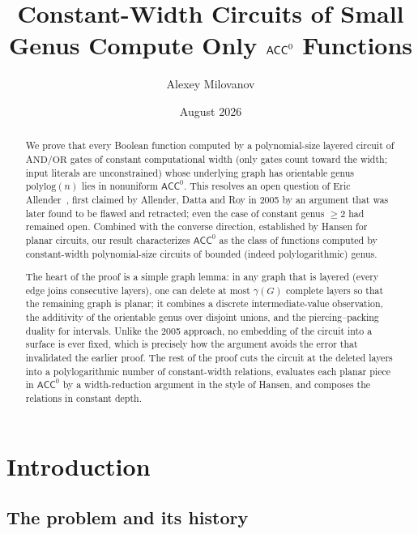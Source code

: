 \documentclass[11pt]{article}
\title{Constant-Width Circuits of Small Genus Compute Only $\ACC$ Functions}
\author{Alexey Milovanov}
\date{August 2026}
\theoremstyle{definition}
\theoremstyle{remark}
\newcommand{\ACC}{\mathsf{ACC}^0}
\newcommand{\genus}{\gamma}
\begin{document}
\maketitle

\begin{abstract}
We prove that every Boolean function computed by a polynomial-size layered circuit
of $\mathrm{AND}/\mathrm{OR}$ gates of constant computational width (only gates
count toward the width; input literals are unconstrained) whose underlying graph
has orientable genus $\mathrm{polylog}(n)$ lies in nonuniform $\ACC$. This resolves an
open question of Eric Allender~\cite{Allender23}, first claimed by Allender,
Datta and Roy in 2005 by an argument that was later found to be flawed and retracted; even the case of constant
genus $\ge 2$ had remained open. Combined with the converse direction, established by Hansen
for planar circuits, our result characterizes $\ACC$ as the class of functions
computed by constant-width polynomial-size circuits of bounded (indeed
polylogarithmic) genus.

The heart of the proof is a simple graph lemma: in any graph
that is layered (every edge joins consecutive layers), one can delete at most
$\genus(G)$ complete layers so that the remaining graph is planar; it combines a
discrete intermediate-value observation, the additivity of the orientable genus over
disjoint unions, and the piercing--packing duality for intervals. Unlike the 2005
approach, no embedding of the circuit into a surface is ever fixed, which is precisely how the argument avoids the error
that invalidated the earlier proof. The rest of the proof cuts the circuit at the
deleted layers into a polylogarithmic number of constant-width relations, evaluates
each planar piece in $\ACC$ by a width-reduction argument in the style of Hansen, and
composes the relations in constant depth.
\end{abstract}

\tableofcontents

\section{Introduction}\label{sec:intro}

\subsection{The problem and its history}\label{sec:history}
\end{document}
